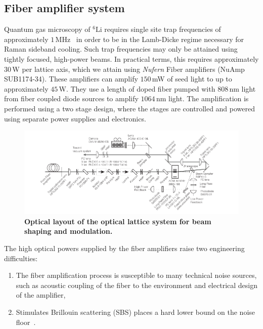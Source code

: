 \documentclass[twocolumn,aps,pra,showpacs,preprintnumbers,bibnotes]{revtex4-1}
\newcommand\Isotope[2]{\ensuremath{^{#1}\mathrm{#2}}}
\newcommand\Li{\Isotope{6}{Li}}
\begin{document}
\subsection{Fiber amplifier system}
Quantum gas microscopy of \Li{} requires single site trap frequencies of approximately $1\,$MHz~\cite{Parsons2015} in order to be in the Lamb-Dicke regime necessary for Raman sideband cooling.
Such trap frequencies may only be attained using tightly focused, high-power beams. 
In practical terms, this requires approximately $30\,$W per lattice axis, which we attain using \textit{Nufern} Fiber amplifiers (NuAmp SUB1174-34).
These amplifiers can amplify $150\,$mW of seed light to up to approximately $45\,$W. They use a length of doped fiber pumped with $808\,$nm light from fiber coupled diode sources to amplify $1064\,$nm light. 
The amplification is performed using a two stage design, where the stages are controlled and powered using separate power supplies and electronics.

\begin{figure}[t]
  \begin{center}
    \includegraphics{fig/optical_layout_wide.pdf}
    \caption{\textbf{Optical layout of the optical lattice system for beam shaping and modulation.}}\label{fig:optical_layout}
  \end{center}
\end{figure}

The high optical powers supplied by the fiber amplifiers raise two engineering difficulties:
\begin{enumerate}
  \item The fiber amplification process is susceptible to many technical noise sources, such as acoustic coupling of the fiber to the environment and electrical design of the amplifier, 
  \item Stimulates Brillouin scattering (SBS) places a hard lower bound on the noise floor~\cite{Agrawal2013}. 
\end{enumerate}
\end{document}
